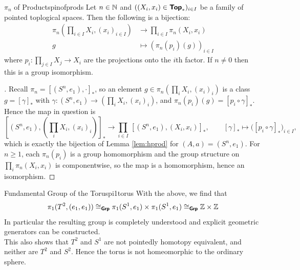 \begin{theorem}{$\pi_n$ of Products}{pinofprods}
  Let $n\in\mathbb{N}$ and $((X_i,x_i)\in\bm{\mathsf{Top}}_*)_{i\in I}$ be a family of pointed toplogical spaces. Then the following is a bijection: \begin{align*}
    \pi_n\left(\prod_{i\in I}X_i,(x_i)_{i\in I}\right) &\longrightarrow \prod_{i\in I}\pi_n(X_i,x_i)\\
    g&\longmapsto (\pi_n(p_i)(g))_{i\in I}
  \end{align*}
  where $p_i:\prod_{j\in I}X_j\to X_i$ are the projections onto the $i$th factor. If $n\neq 0$ then this is a group isomorphism.
\end{theorem}

\begin{proof}[]
  Recall $\pi_n=[(S^n,e_1),\cdot]_*$, so an element $g\in\pi_n(\prod_i X_i,(x_i)_i)$ is a class $g=[\gamma]_*$ with $\gamma:(S^n,e_1)\to(\prod_i X_i,(x_i)_i)$, and $\pi_n(p_i)(g)=[p_i\circ\gamma]_*$. Hence the map in question is
  \[
    [(S^n,e_1),(\textstyle\prod_i X_i,(x_i)_i)]_*\to\prod_{i\in I}\,[(S^n,e_1),(X_i,x_i)]_*,\qquad [\gamma]_*\mapsto\big([p_i\circ\gamma]_*\big)_{i\in I},
  \]
  which is exactly the bijection of Lemma \ref{lem:hprod} for $(A,a)=(S^n,e_1)$. For $n\geq1$, each $\pi_n(p_i)$ is a group homomorphism and the group structure on $\prod_i\pi_n(X_i,x_i)$ is componentwise, so the map is a homomorphism, hence an isomorphism.
\end{proof}

\begin{example}{Fundamental Group of the Torus}{pi1torus}
  With the above, we find that \[
    \pi_1(T^2,(e_1,e_1)) \cong_{\bm{\mathsf{Grp}}} \pi_1(S^1,e_1)\times\pi_1(S^1,e_1) \cong_{\bm{\mathsf{Grp}}} \mathbb{Z}\times\mathbb{Z}
  \]
  In particular the resulting group is completely understood and explicit geometric generators can be constructed.\\

  This also shows that $T^2$ and $S^1$ are not pointedly homotopy equivalent, and neither are $T^2$ and $S^2$. Hence the torus is not homeomorphic to the ordinary sphere.
\end{example}

